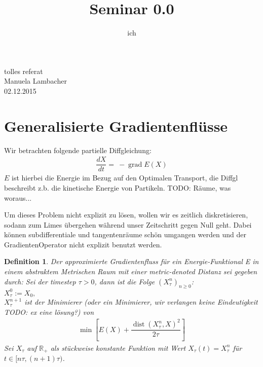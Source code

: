 \documentclass[11pt,a4paper,notitlepage]{scrreprt}
\author{ich}
\title{Seminar 0.0}
\newcommand{\RR}{\mathbb{R}}
\newcommand{\dist}{\operatorname{dist}}
\newcommand{\grad}{\operatorname{grad}}
\newtheorem{defi}{Definition}[section]
\begin{document}
\parindent 0pt



\pagestyle{empty}

\begin{center}
  {\huge{tolles referat}} \\
	Manuela Lambacher \\
	02.12.2015	
 \end{center}


\renewcommand{\thesection}{\arabic{section}}
\section{Generalisierte Gradientenflüsse}

Wir betrachten folgende partielle Diffgleichung: 
\begin{eqnarray}
\dfrac{dX}{dt}=~-\grad E(X) \label{eq1}
\end{eqnarray}
$E$ ist hierbei die Energie im Bezug auf den Optimalen Transport, die Diffgl beschreibt z.b. die kinetische Energie von Partikeln. 
TODO: Räume, was woraus... 
\newline

Um dieses Problem nicht explizit zu lösen, wollen wir es zeitlich diskretisieren, sodann zum Limes übergehen während unser Zeitschritt gegen Null geht. Dabei können subdifferentiale und tangentenräume schön umgangen werden und der GradientenOperator nicht explizit benutzt werden.

\begin{defi}
Der approximierte Gradientenfluss für ein Energie-Funktional E in einem abstraktem Metrischen Raum mit einer metric-denoted Distanz sei gegeben durch:
\newline
Sei der timestep $\tau > 0$, dann ist die Folge $\left( X^n_\tau \right)_{n\geq 0}$:
\\
$X_\tau^0:=X_0,$
\\
$X_\tau^{n+1}$ ist der Minimierer (oder ein Minimierer, wir verlangen keine Eindeutigkeit TODO: ex eine lösung?) von 
\begin{eqnarray}
\min\left[E(X)+\dfrac{\dist(X_\tau^n,X)^2}{2\tau}\right] \label{Min}
\end{eqnarray}
Sei $X_\tau$ auf $\RR_+$ als stückweise konstante Funktion mit Wert $X_\tau(t)=X^n_\tau$ für $t\in [n\tau,(n+1)\tau)$.
\end{defi}
\end{document}
